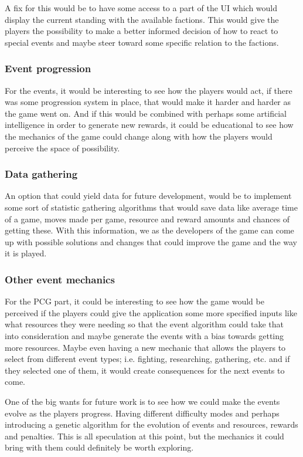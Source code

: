 A fix for this would be to have some access to a part of the UI which would display the current standing with the available factions. This would give the players the possibility to make a better informed decision of how to react to special events and maybe steer toward some specific relation to the factions.

\subsubsection{Event progression}
For the events, it would be interesting to see how the players would act, if there was some progression system in place, that would make it harder and harder as the game went on. And if this would be combined with perhaps some artificial intelligence in order to generate new rewards, it could be educational to see how the mechanics of the game could change along with how the players would perceive the space of possibility.

\subsubsection{Data gathering}
An option that could yield data for future development, would be to implement some sort of statistic gathering algorithms that would save data like average time of a game, moves made per game, resource and reward amounts and chances of getting these. With this information, we as the developers of the game can come up with possible solutions and changes that could improve the game and the way it is played.

\subsubsection{Other event mechanics}
For the PCG part, it could be interesting to see how the game would be perceived if the players could give the application some more specified inputs like what resources they were needing so that the event algorithm could take that into consideration and maybe generate the events with a bias towards getting more resources. Maybe even having a new mechanic that allows the players to select from different event types; i.e. fighting, researching, gathering, etc. and if they selected one of them, it would create consequences for the next events to come.

One of the big wants for future work is to see how we could make the events evolve as the players progress. Having different difficulty modes and perhaps introducing a genetic algorithm for the evolution of events and resources, rewards and penalties. This is all speculation at this point, but the mechanics it could bring with them could definitely be worth exploring.


